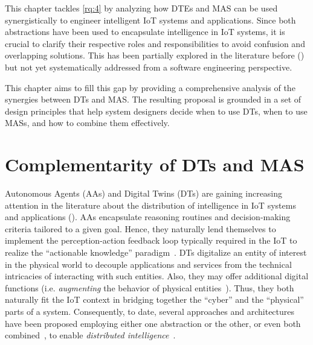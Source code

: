 This chapter tackles \ref{rq:4} by analyzing how \acp{DTE} and \ac{MAS} can be used synergistically to engineer intelligent IoT systems and applications.
%
Since both abstractions have been used to encapsulate intelligence in IoT systems, it is crucial to clarify their respective roles and responsibilities to avoid confusion and overlapping solutions.
%
This has been partially explored in the literature before () but not yet systematically addressed from a software engineering perspective.

This chapter aims to fill this gap by providing a comprehensive analysis of the synergies between \acp{DT} and \ac{MAS}.
%
The resulting proposal is grounded in a set of design principles that help system designers decide when to use \acp{DT}, when to use \acp{MAS}, and how to combine them effectively.

\section{Complementarity of DTs and MAS}

Autonomous Agents (AAs) and Digital Twins (DTs) are gaining increasing attention in the literature about the distribution of intelligence in IoT systems and applications (). 
AAs encapsulate reasoning routines and decision-making criteria tailored to a given goal. 
Hence, they naturally lend themselves to implement the perception-action feedback loop typically required in the IoT to realize the ``actionable knowledge'' paradigm~\cite{Barnaghi2013}. 
DTs digitalize an entity of interest in the physical world to decouple applications and services from the technical intricacies of interacting with such entities. 
Also, they may offer additional digital functions (i.e. \emph{augmenting} the behavior of physical entities~\cite{dt-IoT-context-Minerva-2020}). 
Thus, they both naturally fit the IoT context in bridging together the ``cyber'' and the ``physical'' parts of a system.
%
Consequently, to date, several approaches and architectures have been proposed employing either one abstraction or the other, or even both combined~\cite{Mariani_Picone_Ricci_2022,Kalyani_Collier_2024,Pretel_Moya_Navarro_López-Jaquero_González_2024}, to enable \emph{distributed intelligence}~\cite{Rosendo_Costan_Valduriez_Antoniu_2022,Alsboui_Qin_Hill_Al-Aqrabi_2021}. 

